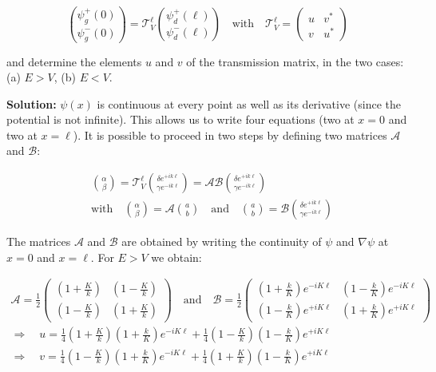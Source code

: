 \documentclass{article}
\begin{document}
\begin{enumerate}
    $$
    \binom{\psi_{g}^{+}(0)}{\psi_{g}^{-}(0)} = \mathcal{T}_{V}^{\ell} \binom{\psi_{d}^{+}(\ell)}{\psi_{d}^{-}(\ell)} \quad \text{with} \quad \mathcal{T}_{V}^{\ell} = \left(\begin{array}{cc}
    u & v^{*} \\
    v & u^{*}
    \end{array}\right)
    $$

    and determine the elements $u$ and $v$ of the transmission matrix, in the two cases: (a) $E>V$, (b) $E<V$.

    {\color{red}\textbf{Solution:} $\psi(x)$ is continuous at every point as well as its derivative (since the potential is not infinite). This allows us to write four equations (two at $x=0$ and two at $x=\ell$). It is possible to proceed in two steps by defining two matrices $\mathcal{A}$ and $\mathcal{B}$:

    $$
    \begin{aligned}
    & \binom{\alpha}{\beta} = \mathcal{T}_{V}^{\ell} \binom{\delta e^{+i k \ell}}{\gamma e^{-i k \ell}} = \mathcal{A B} \binom{\delta e^{+i k \ell}}{\gamma e^{-i k \ell}} \\
    & \text{with} \quad \binom{\alpha}{\beta} = \mathcal{A} \binom{a}{b} \quad \text{and} \quad \binom{a}{b} = \mathcal{B} \binom{\delta e^{+i k \ell}}{\gamma e^{-i k \ell}}
    \end{aligned}
    $$

    The matrices $\mathcal{A}$ and $\mathcal{B}$ are obtained by writing the continuity of $\psi$ and $\nabla \psi$ at $x=0$ and $x=\ell$. For $E>V$ we obtain:

    $$
    \begin{aligned}
    \mathcal{A} = \frac{1}{2} \left(\begin{array}{cc}
    \left(1+\frac{K}{k}\right) & \left(1-\frac{K}{k}\right) \\
    \left(1-\frac{K}{k}\right) & \left(1+\frac{K}{k}\right)
    \end{array}\right) \quad \text{and} \quad \mathcal{B} = \frac{1}{2} \left(\begin{array}{cc}
    \left(1+\frac{k}{K}\right) e^{-i K \ell} & \left(1-\frac{k}{K}\right) e^{-i K \ell} \\
    \left(1-\frac{k}{K}\right) e^{+i K \ell} & \left(1+\frac{k}{K}\right) e^{+i K \ell}
    \end{array}\right) \\
    \Rightarrow \quad u = \frac{1}{4} \left(1+\frac{K}{k}\right) \left(1+\frac{k}{K}\right) e^{-i K \ell} + \frac{1}{4} \left(1-\frac{K}{k}\right) \left(1-\frac{k}{K}\right) e^{+i K \ell} \\
    \Rightarrow \quad v = \frac{1}{4} \left(1-\frac{K}{k}\right) \left(1+\frac{k}{K}\right) e^{-i K \ell} + \frac{1}{4} \left(1+\frac{K}{k}\right) \left(1-\frac{k}{K}\right) e^{+i K \ell}
    \end{aligned}
    $$

}
\end{enumerate}
\end{document}
